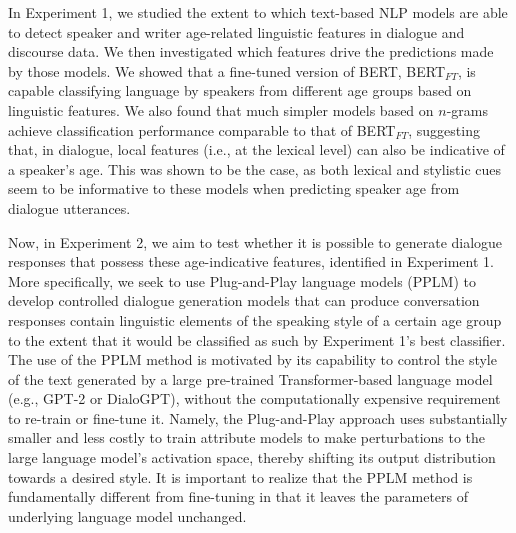 In Experiment 1, we studied the extent to which text-based NLP models are able to detect speaker and writer age-related linguistic features in dialogue and discourse data. We then investigated which features drive the predictions made by those models. We showed that a fine-tuned version of BERT, BERT$_{FT}$, is capable classifying language by speakers from different age groups based on linguistic features. We also found that much simpler models based on $n$-grams achieve classification performance comparable to that of BERT$_{FT}$, suggesting that, in dialogue, local features (i.e., at the lexical level) can also be indicative of a speaker's age. This was shown to be the case, as both lexical and stylistic cues seem to be informative to these models when predicting speaker age from dialogue utterances.

Now, in Experiment 2, we aim to test whether it is possible to generate dialogue responses that possess these age-indicative features, identified in Experiment 1. 
More specifically, we seek to use Plug-and-Play language models (PPLM) \citep{dathathri2019plug} to develop controlled dialogue generation models that can produce conversation responses contain linguistic elements of the speaking style of a certain age group to the extent that it would be classified as such by Experiment 1's best classifier. The use of the PPLM method is motivated by its capability to control the style of the text generated by a large pre-trained Transformer-based language model (e.g., GPT-2 or DialoGPT), without the computationally expensive requirement to re-train or fine-tune it. Namely, the Plug-and-Play approach uses substantially smaller and less costly to train attribute models to make perturbations to the large language model's activation space, thereby shifting its output distribution towards a desired style. It is important to realize that the PPLM method is fundamentally different from fine-tuning in that it leaves the parameters of underlying language model unchanged.

